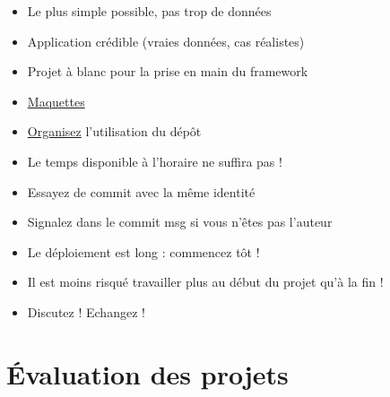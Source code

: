 \begin{itemize}
\tightlist
\item
  Le plus simple possible, pas trop de données
\item
  Application crédible (vraies données, cas réalistes)
\item
  Projet à blanc pour la prise en main du framework
\item
  \href{https://brainhub.eu/blog/difference-between-wireframe-mockup-prototype/}{Maquettes}
\item
  \href{http://drewfradette.ca/a-simpler-successful-git-branching-model/}{Organisez}
  l'utilisation du dépôt
\item
  Le temps disponible à l'horaire ne suffira pas !
\item
  Essayez de commit avec la même identité
\item
  Signalez dans le commit msg si vous n'êtes pas l'auteur
\item
  Le déploiement est long : commencez tôt !
\item
  Il est moins risqué travailler plus au début du projet qu'à la fin !
\item
  Discutez ! Echangez !
\end{itemize}

\hypertarget{uxe9valuation-des-projets}{%
\section{Évaluation des projets}\label{uxe9valuation-des-projets}}


